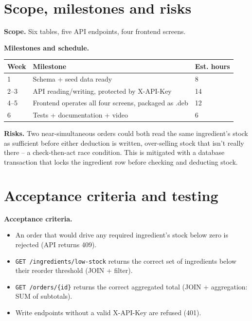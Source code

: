 \documentclass[11pt,a4paper]{article}
\begin{document}
\section{Scope, milestones and risks}

\textbf{Scope.} Six tables, five API endpoints, four frontend screens.

\textbf{Milestones and schedule.}

\renewcommand{\arraystretch}{1.2}
\begin{tabularx}{\linewidth}{@{}p{1.4cm}Xp{1.8cm}@{}}
\toprule
\textbf{Week} & \textbf{Milestone} & \textbf{Est. hours} \\
\midrule
1   & Schema + seed data ready & 8 \\
2--3 & API reading/writing, protected by X-API-Key & 14 \\
4--5 & Frontend operates all four screens, packaged as .deb & 12 \\
6   & Tests + documentation + video & 6 \\
\bottomrule
\end{tabularx}

\textbf{Risks.} Two near-simultaneous orders could both read the same
ingredient's stock as sufficient before either deduction is written,
over-selling stock that isn't really there -- a check-then-act race
condition. This is mitigated with a database transaction that locks the
ingredient row before checking and deducting stock.

\section{Acceptance criteria and testing}

\textbf{Acceptance criteria.}
\begin{itemize}[topsep=2pt]
  \item An order that would drive any required ingredient's stock below
        zero is rejected (API returns 409).
  \item \texttt{GET /ingredients/low-stock} returns the correct set of
        ingredients below their reorder threshold (JOIN + filter).
  \item \texttt{GET /orders/\{id\}} returns the correct aggregated total
        (JOIN + aggregation: SUM of subtotals).
  \item Write endpoints without a valid X-API-Key are refused (401).
\end{itemize}
\end{document}
